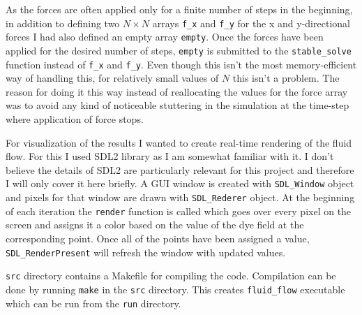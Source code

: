 \documentclass[12pt, letterpaper]{article}
\begin{document}
As the forces are often applied only for a finite number of steps in the beginning,
in addition to defining two $N\times N$ arrays \verb|f_x| and \verb|f_y| for the x and y-directional forces I had also defined an empty array \verb|empty|.
Once the forces have been applied for the desired number of steps, \verb|empty| is submitted to the \verb|stable_solve| function instead of \verb|f_x| and \verb|f_y|.
Even though this isn't the most memory-efficient way of handling this, for relatively small values of $N$ this isn't a problem.
The reason for doing it this way instead of reallocating the values for the force array was to avoid any kind of noticeable stuttering in the simulation at the time-step where application of force stops.

For visualization of the results I wanted to create real-time rendering of the fluid flow.
For this I used SDL2 library\cite{SDL2} as I am somewhat familiar with it.
I don't believe the details of SDL2 are particularly relevant for this project and therefore I will only cover it here briefly.
A GUI window is created with \verb|SDL_Window| object and pixels for that window are drawn with \verb|SDL_Rederer| object.
At the beginning of each iteration the \verb|render| function is called which goes over every pixel on the screen and assigns it a color based on the value of the dye field at the corresponding point.
Once all of the points have been assigned a value, \verb|SDL_RenderPresent| will refresh the window with updated values.

\verb|src| directory contains a Makefile for compiling the code.
Compilation can be done by running \verb|make| in the \verb|src| directory.
This creates \verb|fluid_flow| executable which can be run from the \verb|run| directory.
\end{document}
